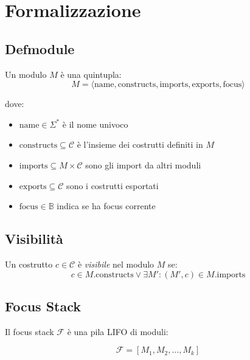 \section{Formalizzazione}

\subsection{Defmodule}

\begin{definizione}[Modulo]
Un modulo $M$ è una quintupla:
\begin{equation}
M = \langle \text{name}, \text{constructs}, \text{imports}, \text{exports}, \text{focus} \rangle
\end{equation}

dove:
\begin{itemize}
\item $\text{name} \in \Sigma^*$ è il nome univoco
\item $\text{constructs} \subseteq \mathcal{C}$ è l'insieme dei costrutti definiti in $M$
\item $\text{imports} \subseteq M \times \mathcal{C}$ sono gli import da altri moduli
\item $\text{exports} \subseteq \mathcal{C}$ sono i costrutti esportati
\item $\text{focus} \in \mathbb{B}$ indica se ha focus corrente
\end{itemize}
\end{definizione}

\subsection{Visibilità}

\begin{definizione}
Un costrutto $c \in \mathcal{C}$ è \textit{visibile} nel modulo $M$ se:
\begin{equation}
c \in M.\text{constructs} \lor \exists M': (M', c) \in M.\text{imports}
\end{equation}
\end{definizione}

\subsection{Focus Stack}

Il focus stack $\mathcal{F}$ è una pila LIFO di moduli:

\begin{equation}
\mathcal{F} = [M_1, M_2, \ldots, M_k]
\end{equation}

